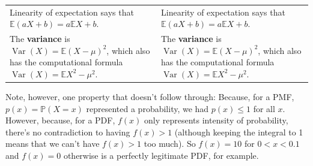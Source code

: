 \documentclass[
  a4paper,
]{book}
\theoremstyle{definition}
\theoremstyle{definition}
\theoremstyle{definition}
\theoremstyle{definition}
\theoremstyle{remark}
\begin{document}
\begin{longtable}[]{@{}
  >{\raggedright\arraybackslash}p{}
  >{\raggedright\arraybackslash}p{}@{}}
Linearity of expectation says that \( \mathbb E(aX+b) = a\mathbb EX + b .\) & Linearity of expectation says that \( \mathbb E(aX+b) = a\mathbb EX + b .\) \\
The \textbf{variance} is \(\operatorname{Var}(X) = \mathbb E(X - \mu)^2\), which also has the computational formula \(\operatorname{Var}(X) = \mathbb EX^2 - \mu^2\). & The \textbf{variance} is \(\operatorname{Var}(X) = \mathbb E(X - \mu)^2\), which also has the computational formula \(\operatorname{Var}(X) = \mathbb EX^2 - \mu^2\). \\
\end{longtable}

Note, however, one property that doesn't follow through: Because, for a PMF, \(p(x) = \mathbb P(X = x)\) represented a probability, we had \(p(x) \leq 1\) for all \(x\). However, because, for a PDF, \(f(x)\) only represents intensity of probability, there's no contradiction to having \(f(x) > 1\) (although keeping the integral to 1 means that we can't have \(f(x) > 1\) too much). So \(f(x) = 10\) for \(0 <x < 0.1\) and \(f(x) = 0\) otherwise is a perfectly legitimate PDF, for example.
\end{document}
